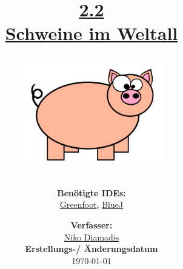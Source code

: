 \documentclass{scrartcl}   %
\begin{document}
\title{\huge{\href{https://www.inf-schule.de/programmierung/oopjava/implementierung/siw}{2.2\\Schweine im Weltall}}\\
\vspace{0.5cm}
\begin{figure}[ht]
	\centering
	\includegraphics[height=4.5cm]{Schweine_im_Weltall.png}
\end{figure}
\vspace{2cm}}

\author{\textbf{Benötigte IDEs:}\\
\href{https://www.greenfoot.org/}{Greenfoot}, \href{https://www.bluej.org/}{BlueJ}
\vspace{2cm}}

\date{\textbf{Verfasser:}\\
\href{https://nikothegreek.jimdofree.com/}{Niko Diamadis}\\
\vspace{0.5cm}
\textbf{Erstellungs-/ Änderungsdatum}\\
\today\enlargethispage{4cm}}

\doublespacing

\maketitle\thispagestyle{empty}

\cleardoublepage

\setcounter{page}{1}
\tableofcontents


\newpage
{}  %
\end{document}
